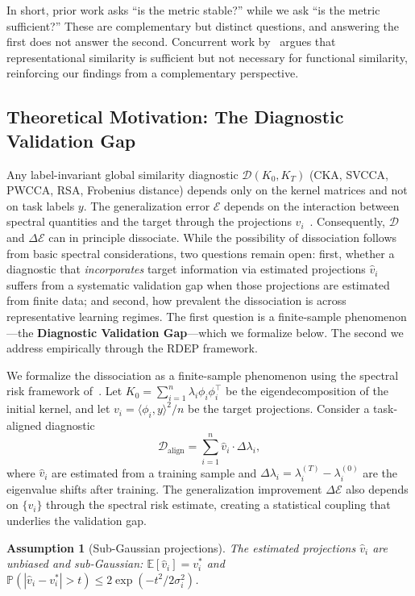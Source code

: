 \documentclass[twoside,11pt]{article}
\newtheorem{assumption}{Assumption}
\begin{document}
In short, prior work asks ``is the metric stable?'' while we ask ``is the metric sufficient?'' These are complementary but distinct questions, and answering the first does not answer the second.  Concurrent work by~\citet{bridging2026usable} argues that representational similarity is sufficient but not necessary for functional similarity, reinforcing our findings from a complementary perspective.

\subsection{Theoretical Motivation: The Diagnostic Validation Gap}
\label{sec:proposition}

Any label-invariant global similarity diagnostic $\mathcal{D}(K_0, K_T)$ (CKA, SVCCA, PWCCA, RSA, Frobenius distance) depends only on the kernel matrices and not on task labels $y$. The generalization error $\mathcal{E}$ depends on the interaction between spectral quantities and the target through the projections $v_i$~\citep{canatar2021spectral}.  Consequently, $\mathcal{D}$ and $\Delta\mathcal{E}$ can in principle dissociate.  While the possibility of dissociation follows from basic spectral considerations, two questions remain open: first, whether a diagnostic that \emph{incorporates} target information via estimated projections $\hat{v}_i$ suffers from a systematic validation gap when those projections are estimated from finite data; and second, how prevalent the dissociation is across representative learning regimes.  The first question is a finite-sample phenomenon---the \textbf{Diagnostic Validation Gap}---which we formalize below.  The second we address empirically through the RDEP framework.

We formalize the dissociation as a finite-sample phenomenon using the spectral risk framework of~\citet{canatar2021spectral}.  Let $K_0 = \sum_{i=1}^n \lambda_i \phi_i \phi_i^\top$ be the eigendecomposition of the initial kernel, and let $v_i = \langle \phi_i, y \rangle^2 / n$ be the target projections.  Consider a task-aligned diagnostic
\[
\mathcal{D}_{\text{align}} = \sum_{i=1}^n \hat{v}_i \cdot \Delta\lambda_i,
\]
where $\hat{v}_i$ are estimated from a training sample and $\Delta\lambda_i = \lambda_i^{(T)} - \lambda_i^{(0)}$ are the eigenvalue shifts after training.  The generalization improvement $\Delta\mathcal{E}$ also depends on $\{v_i\}$ through the spectral risk estimate, creating a statistical coupling that underlies the validation gap.

\begin{assumption}[Sub-Gaussian projections]
\label{assum:proj}
The estimated projections $\hat{v}_i$ are unbiased and sub-Gaussian: $\mathbb{E}[\hat{v}_i] = v_i^*$ and $\mathbb{P}(|\hat{v}_i - v_i^*| > t) \leq 2\exp(-t^2 / 2\sigma_i^2)$.
\end{assumption}
\end{document}

